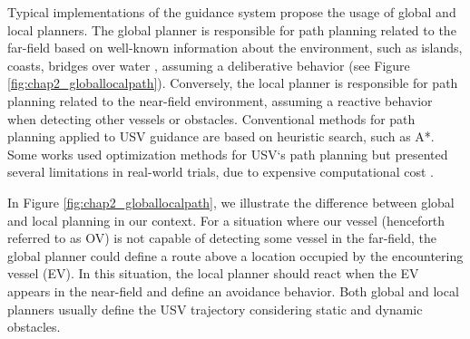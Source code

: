     Typical implementations of the guidance system propose the usage of global and local planners\cite{Liu2016Unmanned}. The global planner is responsible for path planning related to the far-field based on well-known information about the environment, such as islands, coasts, bridges over water \etc, assuming a deliberative behavior (see Figure \ref{fig:chap2_globallocalpath}). Conversely, the local planner is responsible for path planning related to the near-field environment, assuming a reactive behavior when detecting other vessels or obstacles. Conventional methods for path planning applied to \ac{USV} guidance are based on heuristic search\cite{Liu2016Unmanned}, such as A*\cite{Larson2006Autonomous, Naus2013Idea}. Some works used optimization methods for \ac{USV}`s path planning but presented several limitations in real-world trials, due to expensive computational cost \cite{Svec2011Trajectory, Campbell2013Automatic}.

    
    In Figure \ref{fig:chap2_globallocalpath}, we illustrate the difference between global and local planning in our context. For a situation where our vessel (henceforth referred to as \ac{OV}) is not capable of detecting some vessel in the far-field, the global planner could define a route above a location occupied by the encountering vessel (\acs{EV}). In this situation, the local planner should react when the \ac{EV} appears in the near-field and define an avoidance behavior. Both global and local planners usually define the \ac{USV} trajectory considering static and dynamic obstacles.
    
